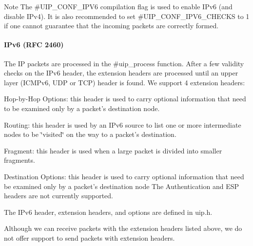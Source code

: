 \begin{DoxyNote}{\-Note}
\-The \#\-U\-I\-P\-\_\-\-C\-O\-N\-F\-\_\-\-I\-P\-V6 compilation flag is used to enable \-I\-Pv6 (and disable \-I\-Pv4). \-It is also recommended to set \#\-U\-I\-P\-\_\-\-C\-O\-N\-F\-\_\-\-I\-P\-V6\-\_\-\-C\-H\-E\-C\-K\-S to 1 if one cannot guarantee that the incoming packets are correctly formed.
\end{DoxyNote}
\hypertarget{a00061_ipv6}{}\paragraph{\-I\-Pv6 (\-R\-F\-C 2460)}\label{a00061_ipv6}
\-The \-I\-P packets are processed in the \#uip\-\_\-process function. \-After a few validity checks on the \-I\-Pv6 header, the extension headers are processed until an upper layer (\-I\-C\-M\-Pv6, \-U\-D\-P or \-T\-C\-P) header is found. \-We support 4 extension headers\-: \begin{DoxyItemize}
\item \-Hop-\/by-\/\-Hop \-Options\-: this header is used to carry optional information that need to be examined only by a packet's destination node. \item \-Routing\-: this header is used by an \-I\-Pv6 source to list one or more intermediate nodes to be \char`\"{}visited\char`\"{} on the way to a packet's destination. \item \-Fragment\-: this header is used when a large packet is divided into smaller fragments. \item \-Destination \-Options\-: this header is used to carry optional information that need be examined only by a packet's destination node \-The \-Authentication and \-E\-S\-P headers are not currently supported.\end{DoxyItemize}
\-The \-I\-Pv6 header, extension headers, and options are defined in uip.\-h.

\-Although we can receive packets with the extension headers listed above, we do not offer support to send packets with extension headers.

